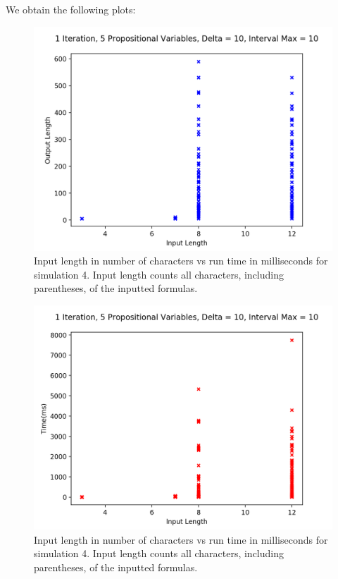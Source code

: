 \documentclass[runningheads]{llncs}
\begin{document}
We obtain the following plots:
\begin{figure}[H]
    \centering
    \includegraphics[scale=0.75]{images/Sim4Length.png}
    \caption{Input length in number of characters vs run time in milliseconds for simulation 4. Input length counts all characters, including parentheses, of the inputted formulas.}
\end{figure}
\begin{figure}[H]
    \centering
    \includegraphics[scale=0.75]{images/Sim4Time.png}
    \caption{Input length in number of characters vs run time in milliseconds for simulation 4. Input length counts all characters, including parentheses, of the inputted formulas.}
\end{figure}
\end{document}
